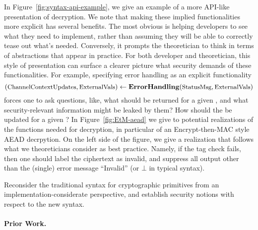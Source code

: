 In Figure~\ref{fig:syntax-api-example}, we give an example of a more
API-like presentation of decryption. 
%
We note that making these implied functionalities more explicit has
several benefits.  The most obvious is helping developers to see
what they need to implement, rather than assuming they will be able to
correctly tease out what's needed.  Conversely, it prompts the
theoretician to think in terms of abstractions that appear in
practice.  
%
For both developer and theoretician, this style of presentation can 
surface a clearer picture what security demands of these
functionalities.  For example, specifying error handling as an
explicit functionality
\[
(\varfont{ChannelContextUpdates}, \varfont{ExternalVals}) \gets
                                  \algfont{ErrorHandling}(%
                                  \varfont{StatusMsg}, \varfont{ExternalVals})
\]
forces one to ask questions, like, what  should
be returned for a given , and what
security-relevant information might be leaked by them?  How should the
 be updated for a given ?
In Figure~\ref{fig:EtM-aead} we give to potential realizations of the
functions needed for decryption, in particular of an Encrypt-then-MAC
style AEAD decrpytion.  On the left side of the figure, we
give a realization that follows what we theoreticians consider as best
practice.  Namely, if the tag check fails, then one should label the
ciphertext as invalid, and suppress all output other than the (single)
error message ``Invalid'' (or $\bot$ in typical syntax).







\begin{task}
{Reconsider the traditional syntax for cryptographic primitives from an implementation-considerate perspective, and establish security notions with respect to the new syntax. }
\end{task}

\paragraph{Prior Work.} 


